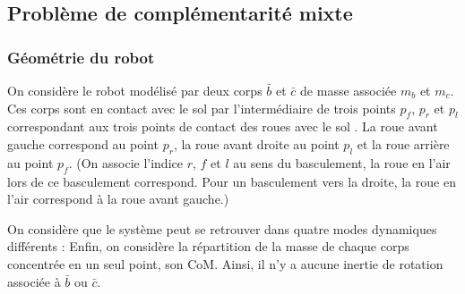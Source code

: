 		\subsection{Problème de complémentarité mixte}
		
			\subsubsection{Géométrie du robot}
			\label{section.geometrie}
		
				On considère le robot modélisé par deux corps $\bar{b}$ et $\bar{c}$ de masse associée $m_b$ et $m_c$. 
				Ces corps sont en contact avec le sol par l'intermédiaire de trois points $p_f$, $p_r$ et $p_l$ correspondant aux trois points de contact des roues avec le sol .
				La roue avant gauche correspond au point $p_r$, la roue avant droite au point $p_l$ et la roue arrière au point $p_f$.
				(On associe l'indice $r$, $f$ et $l$ au sens du basculement, la roue en l'air lors de ce basculement correspond. Pour un basculement vers la droite, la roue en l'air correspond à la roue avant gauche.)
				
				
				On considère que le système peut se retrouver dans quatre modes dynamiques différents :
				Enfin, on considère la répartition de la masse de chaque corps concentrée en un seul point, son CoM. Ainsi, il n'y a aucune inertie de rotation associée à $\bar{b}$ ou $\bar{c}$.
				
				
